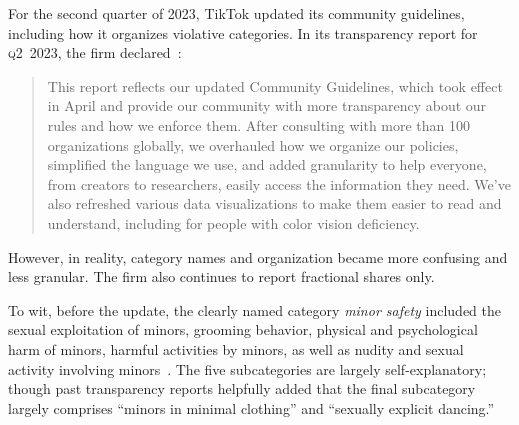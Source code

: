 \documentclass[nonacm,screen]{acmart}
\newcommand\V[1]{\textsc{\MakeLowercase{#1}}}
\begin{document}
For the second quarter of 2023, TikTok updated its community guidelines,
including how it organizes violative categories. In its transparency report for
\V{Q2}~2023, the firm declared~\cite{TikTok2023}:
    \begin{quote}
    This report reflects our updated Community Guidelines, which took effect in
    April and provide our community with more transparency about our rules and
    how we enforce them. After consulting with more than 100 organizations
    globally, we overhauled how we organize our policies, simplified the
    language we use, and added granularity to help everyone, from creators to
    researchers, easily access the information they need. We’ve also refreshed
    various data visualizations to make them easier to read and understand,
    including for people with color vision deficiency.
    \end{quote}
However, in reality, category names and organization became more confusing and
less granular. The firm also continues to report fractional shares only.

To wit, before the update, the clearly named category \emph{minor safety}
included the sexual exploitation of minors, grooming behavior, physical and
psychological harm of minors, harmful activities by minors, as well as nudity
and sexual activity involving minors~\cite{TikTok2023a}. The five subcategories
are largely self-explanatory; though past transparency reports helpfully added
that the final subcategory largely comprises ``minors in minimal clothing'' and
``sexually explicit dancing.''
\end{document}
